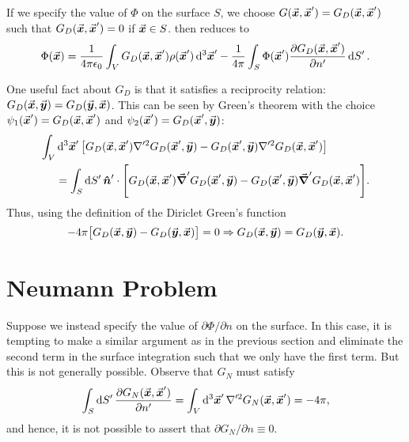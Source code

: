 If we specify the value of $\Phi$ on the surface $S$, we choose $G(\va*{x},\va*{x}') = G_{D}(\va*{x},\va*{x}')$ such that $G_{D}(\va*{x},\va*{x}') = 0$ if $\va*{x} \in S$.
 then reduces to
\begin{align}
    \Phi(\va*{x}) = \frac{1}{4 \pi \epsilon_0} \int_{V} G_{D}(\va*{x},\va*{x}') \rho(\va*{x}') \dd[3]{\va*{x}'} - \frac{1}{4 \pi} \int_{S} \Phi(\va*{x}') \pdv{G_{D}(\va*{x},\va*{x}')}{n'} \dd{S'}
.\end{align}

One useful fact about $G_{D}$ is that it satisfies a reciprocity relation: $G_{D}(\va*{x},\va*{y}) = G_{D}(\va*{y},\va*{x})$.
This can be seen by Green's theorem with the choice $\psi_1(\va*{x}') = G_{D}(\va*{x},\va*{x}')$ and $\psi_2(\va*{x}') = G_{D}(\va*{x}',\va*{y})$:
\begin{align}
    \int_{V} &\dd[3]{\va*{x}'} \big[ G_{D}(\va*{x},\va*{x}') \nabla'^2 G_{D}(\va*{x}',\va*{y}) - G_{D}(\va*{x}',\va*{y}) \nabla'^2 G_{D}(\va*{x},\va*{x}') \big] \nonumber \\
             &= \int_{S} \dd{S'} \vu*{n}' \cdot \Bigg[ G_{D}(\va*{x},\va*{x}') \grad' G_{D}(\va*{x}',\va*{y}) - G_{D}(\va*{x}',\va*{y}) \grad' G_{D}(\va*{x},\va*{x}') \Bigg]
.\end{align}
Thus, using the definition of the Diriclet Green's function
\begin{eqnarray}
    -4 \pi \big[ G_{D}(\va*{x},\va*{y}) - G_{D}(\va*{y},\va*{x}) \big] = 0 \Rightarrow G_{D}(\va*{x},\va*{y}) = G_{D}(\va*{y},\va*{x})
.\end{eqnarray}


\section{Neumann Problem}

Suppose we instead specify the value of $\partial \Phi/ \partial n$ on the surface.
In this case, it is tempting to make a similar argument as in the previous section and eliminate the second term in the surface integration such that we only have the first term.
But this is not generally possible.
Observe that $G_{N}$ must satisfy
\begin{align}
    \int_{S} \dd{S'} \pdv{G_{N}(\va*{x},\va*{x}')}{n'} = \int_{V} \dd[3]{\va*{x}'} \nabla'^2 G_{N}(\va*{x},\va*{x}') = - 4 \pi
,\end{align}
and hence, it is not possible to assert that $\partial G_{N} / \partial n \equiv 0$.

